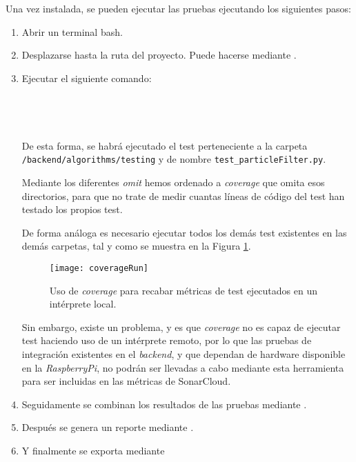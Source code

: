 Una vez instalada, se pueden ejecutar las pruebas ejecutando los siguientes pasos: 
\begin{enumerate}
\item Abrir un terminal bash.
\item Desplazarse hasta la ruta del proyecto. Puede hacerse mediante .
\item Ejecutar el siguiente comando:\\ \\ \\ \\ \\ 
De esta forma, se habrá ejecutado el test perteneciente a la carpeta \texttt{/backend/algorithms/testing} y de nombre \texttt{test\_particleFilter.py}. 

Mediante los diferentes \emph{omit} hemos ordenado a \emph{coverage} que omita esos directorios, para que no trate de medir cuantas líneas de código del test han testado los propios test.

De forma análoga es necesario ejecutar todos los demás test existentes en las demás carpetas, tal y como se muestra en la Figura \ref{fig:coverageRun}.
\begin{figure}
	\centering
	\texttt{[image: coverageRun]}
	\caption[Uso de \emph{coverage} para recabar métricas de test]{Uso de \emph{coverage} para recabar métricas de test ejecutados en un intérprete local.}\label{fig:coverageRun}
\end{figure}

Sin embargo, existe un problema, y es que \emph{coverage} no es capaz de ejecutar test haciendo uso de un intérprete remoto, por lo que las pruebas de integración existentes en el \emph{backend}, y que dependan de hardware disponible en la \emph{RaspberryPi}, no podrán ser llevadas a cabo mediante esta herramienta para ser incluidas en las métricas de SonarCloud.

\item Seguidamente se combinan los resultados de las pruebas mediante .
\item Después se genera un reporte mediante .
\item Y finalmente se exporta mediante 
\end{enumerate}

